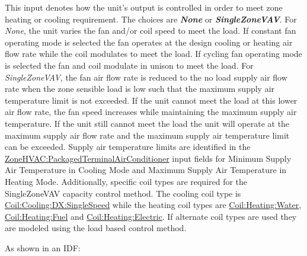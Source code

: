 This input denotes how the unit's output is controlled in order to meet zone heating or cooling requirement. The choices are \textbf{\emph{None}} or \textbf{\emph{SingleZoneVAV}}. For \emph{None}, the unit varies the fan and/or coil speed to meet the load. If constant fan operating mode is selected the fan operates at the design cooling or heating air flow rate while the coil modulates to meet the load. If cycling fan operating mode is selected the fan and coil modulate in unison to meet the load. For \emph{SingleZoneVAV}, the fan air flow rate is reduced to the no load supply air flow rate when the zone sensible load is low such that the maximum supply air temperature limit is not exceeded. If the unit cannot meet the load at this lower air flow rate, the fan speed increases while maintaining the maximum supply air temperature. If the unit still cannot meet the load the unit will operate at the maximum supply air flow rate and the maximum supply air temperature limit can be exceeded. Supply air temperature limits are identified in the \hyperref[zonehvacpackagedterminalairconditioner]{ZoneHVAC:PackagedTerminalAirConditioner} input fields for Minimum Supply Air Temperature in Cooling Mode and Maximum Supply Air Temperature in Heating Mode. Additionally, specific coil types are required for the SingleZoneVAV capacity control method. The cooling coil type is \hyperref[coilcoolingdxsinglespeed]{Coil:Cooling:DX:SingleSpeed} while the heating coil types are \hyperref[coilheatingwater]{Coil:Heating:Water}, \hyperref[coilheatinggas-000]{Coil:Heating:Fuel} and \hyperref[coilheatingelectric]{Coil:Heating:Electric}. If alternate coil types are used they are modeled using the load based control method.


As shown in an IDF:

